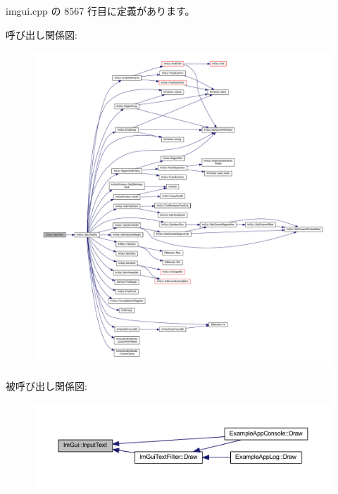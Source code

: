  imgui.\+cpp の 8567 行目に定義があります。

呼び出し関係図\+:\nopagebreak
\begin{figure}[H]
\begin{center}
\leavevmode
\includegraphics[width=350pt]{namespace_im_gui_af2faa757ec3f5e6379f15b0acfac48f7_cgraph}
\end{center}
\end{figure}
被呼び出し関係図\+:\nopagebreak
\begin{figure}[H]
\begin{center}
\leavevmode
\includegraphics[width=350pt]{namespace_im_gui_af2faa757ec3f5e6379f15b0acfac48f7_icgraph}
\end{center}
\end{figure}
\mbox{\label{namespace_im_gui_a4a62260abe773d4e193db94cdfdc41bf}} 
